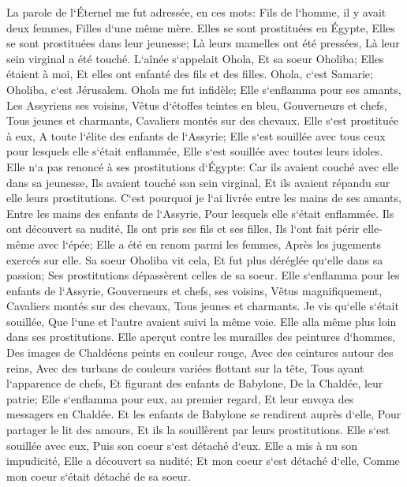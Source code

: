 \verse La parole de l`Éternel me fut adressée, en ces mots: 
\verse Fils de l`homme, il y avait deux femmes, Filles d`une même mère. 
\verse Elles se sont prostituées en Égypte, Elles se sont prostituées dans leur jeunesse; Là leurs mamelles ont été pressées, Là leur sein virginal a été touché. 
\verse L`aînée s`appelait Ohola, Et sa soeur Oholiba; Elles étaient à moi, Et elles ont enfanté des fils et des filles. Ohola, c`est Samarie; Oholiba, c`est Jérusalem. 
\verse Ohola me fut infidèle; Elle s`enflamma pour ses amants, Les Assyriens ses voisins, 
\verse Vêtus d`étoffes teintes en bleu, Gouverneurs et chefs, Tous jeunes et charmants, Cavaliers montés sur des chevaux. 
\verse Elle s`est prostituée à eux, A toute l`élite des enfants de l`Assyrie; Elle s`est souillée avec tous ceux pour lesquels elle s`était enflammée, Elle s`est souillée avec toutes leurs idoles. 
\verse Elle n`a pas renoncé à ses prostitutions d`Égypte: Car ils avaient couché avec elle dans sa jeunesse, Ils avaient touché son sein virginal, Et ils avaient répandu sur elle leurs prostitutions. 
\verse C`est pourquoi je l`ai livrée entre les mains de ses amants, Entre les mains des enfants de l`Assyrie, Pour lesquels elle s`était enflammée. 
\verse Ils ont découvert sa nudité, Ils ont pris ses fils et ses filles, Ils l`ont fait périr elle-même avec l`épée; Elle a été en renom parmi les femmes, Après les jugements exercés sur elle. 
\verse Sa soeur Oholiba vit cela, Et fut plus déréglée qu`elle dans sa passion; Ses prostitutions dépassèrent celles de sa soeur. 
\verse Elle s`enflamma pour les enfants de l`Assyrie, Gouverneurs et chefs, ses voisins, Vêtus magnifiquement, Cavaliers montés sur des chevaux, Tous jeunes et charmants. 
\verse Je vis qu`elle s`était souillée, Que l`une et l`autre avaient suivi la même voie. 
\verse Elle alla même plus loin dans ses prostitutions. Elle aperçut contre les murailles des peintures d`hommes, Des images de Chaldéens peints en couleur rouge, 
\verse Avec des ceintures autour des reins, Avec des turbans de couleurs variées flottant sur la tête, Tous ayant l`apparence de chefs, Et figurant des enfants de Babylone, De la Chaldée, leur patrie; 
\verse Elle s`enflamma pour eux, au premier regard, Et leur envoya des messagers en Chaldée. 
\verse Et les enfants de Babylone se rendirent auprès d`elle, Pour partager le lit des amours, Et ils la souillèrent par leurs prostitutions. Elle s`est souillée avec eux, Puis son coeur s`est détaché d`eux. 
\verse Elle a mis à nu son impudicité, Elle a découvert sa nudité; Et mon coeur s`est détaché d`elle, Comme mon coeur s`était détaché de sa soeur. 
